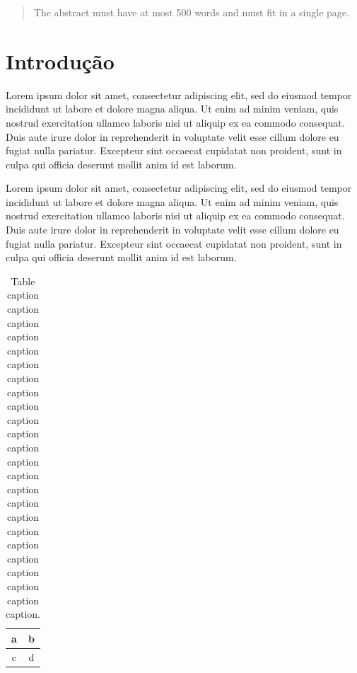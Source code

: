 \documentclass[Portugues]{ic-tese-v3}
\begin{document}
\begin{abstract}
The abstract must have at most 500 words and must fit in a single page.
\end{abstract}




\listoffigures

\listoftables





\tableofcontents

\fimdaspaginasiniciais


\chapter{Introdução}

Lorem ipsum dolor sit amet, consectetur adipiscing elit, sed do eiusmod
tempor incididunt ut labore et dolore magna aliqua. Ut enim ad minim
veniam, quis nostrud exercitation ullamco laboris nisi ut aliquip ex ea
commodo consequat. Duis aute irure dolor in reprehenderit in voluptate
velit esse cillum dolore eu fugiat nulla pariatur. Excepteur sint occaecat
cupidatat non proident, sunt in culpa qui officia deserunt mollit anim id
est laborum.

Lorem ipsum dolor sit amet, consectetur adipiscing elit, sed do eiusmod
tempor incididunt ut labore et dolore magna aliqua. Ut enim ad minim
veniam, quis nostrud exercitation ullamco laboris nisi ut aliquip ex ea
commodo consequat. Duis aute irure dolor in reprehenderit in voluptate
velit esse cillum dolore eu fugiat nulla pariatur. Excepteur sint occaecat
cupidatat non proident, sunt in culpa qui officia deserunt mollit anim id
est laborum.

\begin{table}
\caption[Shorter table caption]{Table caption caption caption caption
  caption caption caption caption caption caption caption caption caption
  caption caption caption caption caption caption caption caption caption
  caption caption.}
\label{f:smile}
\begin{center}
\begin{tabular}{|c|c|}
\hline
a & b \\\hline
c & d \\\hline
\end{tabular}
\end{center}
\end{table}
\end{document}
